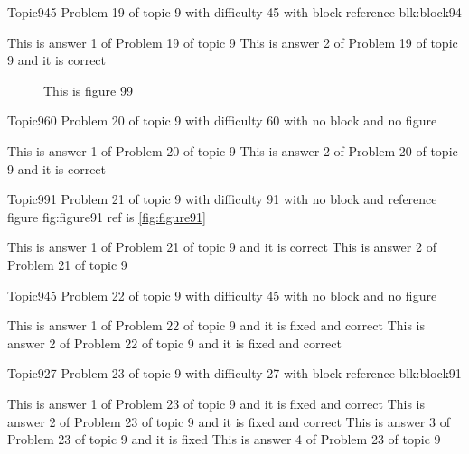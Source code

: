 \documentclass[master]{exam}
\begin{document}
\begin{problem}[requires=blk:block94]{Topic9}{45}
	Problem 19 of topic 9 with difficulty 45 with block reference blk:block94
	\begin{answers}
		\answer This is answer 1 of Problem 19 of topic 9 
		\answer[correct] This is answer 2 of Problem 19 of topic 9 and it is correct
	\end{answers}
\end{problem}



\begin{figure}
	\begin{center}
		This is figure 99 
		\label{fig:figure99}
	\end{center}
\end{figure}

\begin{problem}{Topic9}{60}
	Problem 20 of topic 9 with difficulty 60 with no block and no figure
	\begin{answers}
		\answer This is answer 1 of Problem 20 of topic 9 
		\answer[correct] This is answer 2 of Problem 20 of topic 9 and it is correct
	\end{answers}
\end{problem}

\begin{problem}{Topic9}{91}
	Problem 21 of topic 9 with difficulty 91 with no block and reference figure fig:figure91 ref is \ref{fig:figure91}
	\begin{answers}
		\answer[correct] This is answer 1 of Problem 21 of topic 9 and it is correct
		\answer This is answer 2 of Problem 21 of topic 9 
	\end{answers}
\end{problem}

\begin{problem}{Topic9}{45}
	Problem 22 of topic 9 with difficulty 45 with no block and no figure
	\begin{answers}
		 This is answer 1 of Problem 22 of topic 9 and it is fixed and correct
		 This is answer 2 of Problem 22 of topic 9 and it is fixed and correct
	\end{answers}
\end{problem}

\begin{problem}[requires=blk:block91]{Topic9}{27}
	Problem 23 of topic 9 with difficulty 27 with block reference blk:block91
	\begin{answers}
		 This is answer 1 of Problem 23 of topic 9 and it is fixed and correct
		 This is answer 2 of Problem 23 of topic 9 and it is fixed and correct
		\answer[fixed] This is answer 3 of Problem 23 of topic 9 and it is fixed
		\answer This is answer 4 of Problem 23 of topic 9 
	\end{answers}
\end{problem}
\end{document}
